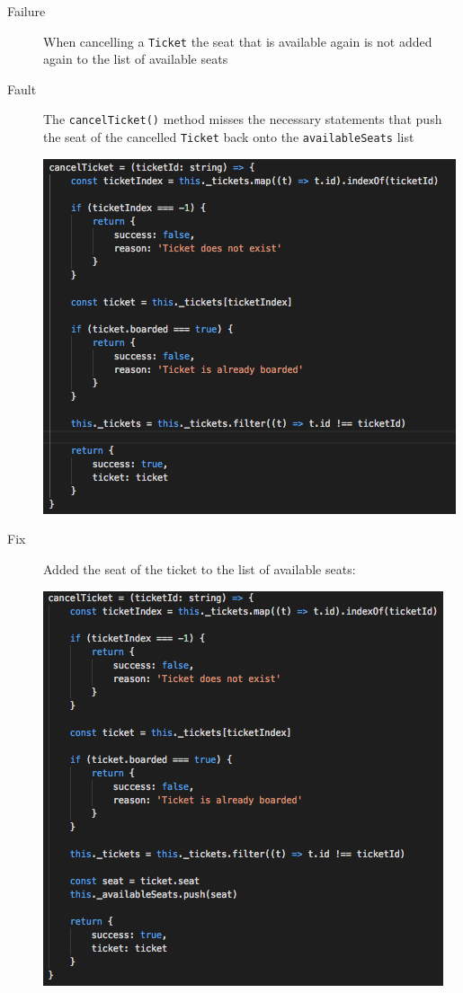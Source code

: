 \documentclass[11pt]{article}
\begin{document}
\begin{description}
\item[{Failure}] When cancelling a \texttt{Ticket} the seat that is available again is not added again to the list of available seats
\item[{Fault}] The \texttt{cancelTicket()} method misses the necessary statements that push the seat of the cancelled \texttt{Ticket} back onto the \texttt{availableSeats} list
\begin{center}
\includegraphics[width=.9\linewidth]{./Iteration2.rtfd/Pasted Graphic 2.tiff.png}
\end{center}
\item[{Fix}] Added the seat of the ticket to the list of available seats:
\begin{center}
\includegraphics[width=.9\linewidth]{./Iteration2.rtfd/1_Pasted Graphic 3.tiff.png}
\end{center}
\end{description}
\end{document}
